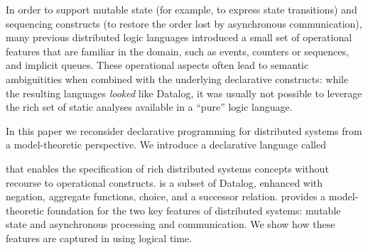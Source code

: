 In order to support mutable state (for example, to express state transitions) and 
sequencing constructs (to restore the order lost by asynchronous communication),
many previous distributed logic languages introduced a small set of operational
features that are familiar in the domain, such as events, counters or sequences, 
and implicit queues.  
These operational aspects often lead to semantic ambiguitities when combined
with the underlying declarative constructs: while the resulting languages {\em looked}
like Datalog, it was usually not possible to leverage the rich set of static analyses 
available in a ``pure'' logic language.


In this paper we reconsider declarative programming for distributed
systems from a model-theoretic perspective. We introduce a declarative
language called \lang
\begin{comment}
\footnote{\small \lang is intended as a precursor
  language for \textbf{Bloom}, a high-level language for programming
  distributed systems that will replace Overlog in the \textbf{BOOM}
  project~\cite{boom-eurosys}.  As such, it is derived from the
  character Stephen Dedalus in James Joyce's \emph{Ulysses}, whose
  dense and precise chapters precede those of the novel's hero,
  Leopold Bloom.  The character Dedalus, in turn, was partly derived
  from Daedalus, the greatest of the Greek engineers and father of
  Icarus.  Unlike Overlog, which flew too close to the sun, Dedalus
  remains firmly grounded.  } 
\end{comment}
that enables the specification of rich
distributed systems concepts without recourse to operational
constructs.
\lang is a subset of
Datalog, enhanced with negation, aggregate functions, choice,
and a successor relation.  
\lang provides a model-theoretic 
foundation
for the two key features of distributed systems: mutable state and
asynchronous processing and communication.  We show how these features
are captured in \lang using logical time. 

